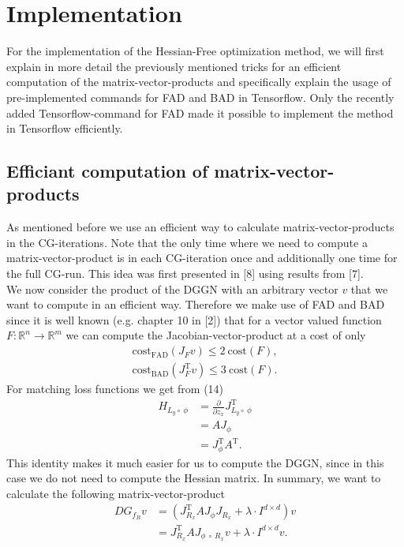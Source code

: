 \documentclass[conference]{IEEEtran}
\begin{document}
\section {Implementation}
\noindent
For the implementation of the Hessian-Free optimization method, we will first explain in more detail the previously mentioned tricks for an efficient computation of the matrix-vector-products and specifically explain the usage of pre-implemented commands for FAD and BAD in Tensorflow. Only the recently added Tensorflow-command for FAD made it possible to implement the method in Tensorflow efficiently.


\subsection{Efficiant computation of matrix-vector-products}
\noindent
As mentioned before we use an efficient way to calculate matrix-vector-products in the CG-iterations. Note that the only time where we need to compute a matrix-vector-product is in each CG-iteration once and additionally one time for the full CG-run. This idea was first presented in [8] using results from [7].\\ 
We now consider the product of the DGGN with an arbitrary vector $v$ that we want to compute in an efficient way.
Therefore we make use of FAD and BAD since it is well known (e.g. chapter 10 in [2]) that for a vector valued function $F:\mathbb{R}^{n}\rightarrow\mathbb{R}^{m}$ we can compute the Jacobian-vector-product at a cost of only
\begin{align}
\mathrm{cost}_{\text{FAD}}(J_{F}v)\leq 2\:\mathrm{cost}(F),\\
\mathrm{cost}_{\text{BAD}}(J_{F}^{\mathrm{T}}v)\leq 3\:\mathrm{cost}(F).
\end{align}
For matching loss functions we get from (14)
\begin{align}
H_{L_{y}\circ\:\phi} &= \frac{\partial}{\partial z_{x}}J_{L_{y}\circ\:\phi}^{\mathrm{T}}\\
&= AJ_{\phi} \\
&= J_{\phi}^{\mathrm{T}}A^{\mathrm{T}}.
\end{align}
This identity makes it much easier for us to compute the DGGN, since in this case we do not need to compute the Hessian matrix. In summary, we want to calculate the following matrix-vector-product
\begin{align}
DG_{f_{B}}v &=  \left(J_{R_{x}}^{\mathrm{T}}AJ_{\phi}J_{R_{x}} + \lambda\cdot I^{d\times d}\right)v\\
&= J_{R_{x}}^{\mathrm{T}}AJ_{\phi\:\circ\: R _{x}}v + \lambda\cdot I^{d\times d}v.
\end{align}
\end{document}
